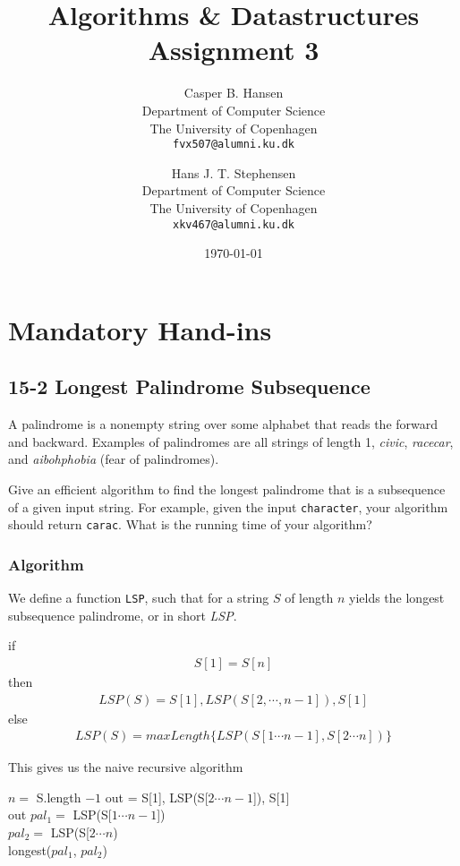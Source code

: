 \documentclass[11pt,english]{article}
\title
{
	\vspace{1in}
	Algorithms \& Datastructures\\
	\huge Assignment 3
}
\author
{
	Casper B. Hansen\\
	\small Department of Computer Science\\
	\small The University of Copenhagen\\
	\texttt{fvx507@alumni.ku.dk}
	\and
	Hans J. T. Stephensen\\
	\small Department of Computer Science\\
	\small The University of Copenhagen\\
	\texttt{xkv467@alumni.ku.dk}
}
\date{\today}
\begin{document}
\clearpage
\maketitle
\thispagestyle{empty}


\newpage
\pagestyle{fancy}

\section*{Mandatory Hand-ins}

\subsection*{15-2 Longest Palindrome Subsequence}
\large{A palindrome is a nonempty string over some alphabet that reads the
forward and backward. Examples of palindromes are all strings of length 1,
\textit{civic}, \textit{racecar}, and \textit{aibohphobia} (fear of
palindromes).

Give an efficient algorithm to find the longest palindrome that is a
subsequence of a given input string. For example, given the input
\texttt{character}, your algorithm should return \texttt{carac}. What is the
running time of your algorithm?}

\subsubsection*{Algorithm}
We define a function \texttt{LSP}, such that for a string $S$ of length $n$
yields the longest subsequence palindrome, or in short \textit{LSP}.

if
\begin{align*}
S[1] = S[n]
\end{align*}
then
\begin{align*}
LSP(S) = S[1], LSP(S[2, \cdots , n-1]), S[1]
\end{align*}
else
\begin{align*}
LSP(S) = maxLength\{ LSP(S[1 \cdots n-1], S[2 \cdots n]) \}
\end{align*}

\noindent
This gives us the naive recursive algorithm

\begin{algorithm}
	
	\BlankLine
	
	$n = $ S.length $-1$ 
	{   
	    out = S[1], LSP(S[$2 \cdots n-1$]), S[1] \\
		\Return out
	}	
	$pal_1 =$ LSP(S[$1 \cdots n-1$]) \\
	$pal_2 =$ LSP(S[$2 \cdots n$) \\
	\Return longest($pal_1$, $pal_2$)
\end{algorithm}
\end{document}

